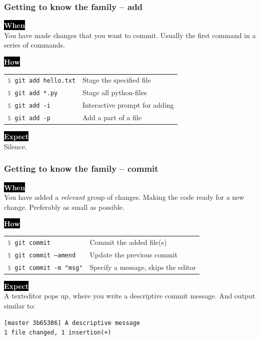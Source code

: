 \documentclass{beamer}
\newcommand{\keyword}[1]{\hspace{-1.0em}\colorbox{black}{\textcolor{white}{\textbf{#1}\vphantom{Ep}}}\vspace{0.2em}} %
\newcommand{\command}[1]{\texttt{\textcolor{gray}{\$} {#1}}}
\begin{document}
\begin{frame}
  \frametitle{Getting to know the family -- add}
  \keyword{When}\\
    You have made changes that you want to commit.
    Usually the first command in a series of commands.
  \vspace{0.5em}

  \keyword{How}\\
  \hspace{-1.0em}
  \begin{tabular}{ll}
    \command{git add hello.txt} & Stage the specified file \\
    \command{git add *.py} & Stage all python-files \\
    \command{git add -i} & Interactive prompt for adding \\
    \command{git add -p} & Add a part of a file \\
  \end{tabular}
  \vspace{0.5em}

  \keyword{Expect}\\
  Silence.
\end{frame}

\begin{frame}[fragile]
  \frametitle{Getting to know the family -- commit}
  \keyword{When}\\
    You have added a \emph{relevant} group of changes. Making
    the code ready for a new change. Preferably as small as possible.
  \vspace{0.5em}

  \keyword{How}\\
  \hspace{-1.0em}
  \begin{tabular}{ll}
    \command{git commit} & Commit the added file(s) \\
    \command{git commit --amend} & Update the previous commit \\
    \command{git commit -m "msg"} & Specify a message, skips the editor \\
  \end{tabular}
  \vspace{0.5em}

  \keyword{Expect}\\
  A texteditor pops up, where you write a descriptive commit message. And
  output similar to: \\
\begin{verbatim}
[master 3b65386] A descriptive message
1 file changed, 1 insertion(+)
\end{verbatim}

\end{frame}
\end{document}
